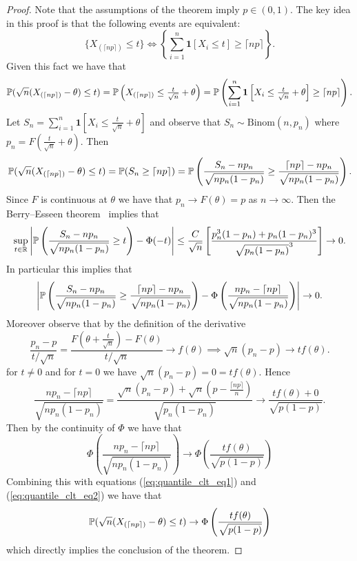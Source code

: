 \begin{proof}
	Note that the assumptions of the theorem imply $p \in (0, 1)$. The key idea in this proof is that the following events are equivalent: \[
		\{ X_{(\lceil np \rceil)} \leq t \} \iff \left\{ \sum_{i=1}^n \mathbf{1}[X_i \leq t] \geq \lceil np \rceil \right\}.
	\] Given this fact we have that \[
		\mathbb{P}(\sqrt{n} (X_{(\lceil np \rceil)} - \theta) \leq t) = \mathbb{P}\left(X_{(\lceil np \rceil)} \leq \tfrac{t}{\sqrt{n}} + \theta\right) = \mathbb{P}\left( \sum_{i=1}^n \mathbf{1}\left[X_i \leq \tfrac{t}{\sqrt{n}} + \theta\right] \geq \lceil np \rceil \right).
	\] Let $S_n = \sum_{i=1}^n \mathbf{1}\left[X_i \leq \tfrac{t}{\sqrt{n}} + \theta\right]$ and observe that $S_n \sim \text{Binom}\left(n, p_n\right)$ where $p_n = F(\tfrac{t}{\sqrt{n}} + \theta)$. Then \begin{equation}
		\mathbb{P}(\sqrt{n} (X_{(\lceil np \rceil)} - \theta) \leq t) = \mathbb{P}(S_n \geq \lceil np \rceil) = \mathbb{P}\left( \frac{S_n - np_n}{\sqrt{np_n(1-p_n)}} \geq \frac{\lceil np \rceil - np_n}{\sqrt{np_n(1-p_n)}}  \right). \label{eq:quantile_clt_eq1}
	\end{equation}
	Since $F$ is continuous at $\theta$ we have that $p_n \to F(\theta) = p$ as $n \to \infty$. Then the Berry--Esseen theorem~\cite{Berry1941,Esseen1942} implies that \[
		\sup_{t \in \mathbb{R}} \left| \mathbb{P}\left( \frac{S_n - np_n}{\sqrt{np_n(1-p_n)}} \geq t \right) - \Phi(-t) \right| \leq \frac{C}{\sqrt{n}} \left[\frac{p_n^3(1-p_n) + p_n(1-p_n)^3}{\sqrt{p_n(1-p_n)}^3} \right] \to 0.
	\] In particular this implies that \begin{equation}
	\left| \mathbb{P}\left( \frac{S_n - np_n}{\sqrt{np_n(1-p_n)}} \geq \frac{\lceil np \rceil - np_n}{\sqrt{np_n(1-p_n)}}  \right) - \Phi\left( \frac{np_n - \lceil np \rceil}{\sqrt{np_n(1-p_n)}}  \right) \right| \to 0. \label{eq:quantile_clt_eq2}
	\end{equation} Moreover observe that by the definition of the derivative\[
		\frac{p_n - p}{t / \sqrt{n}} = \frac{F\left(\theta + \tfrac{t}{\sqrt{n}}\right) - F(\theta)}{t/\sqrt{n}} \to f(\theta) \implies \sqrt{n} (p_n - p) \to tf(\theta).
	\] for $t \neq 0$ and for $t = 0$ we have $\sqrt{n} (p_n - p) = 0 = tf(\theta)$. Hence \[
		\frac{np_n - \lceil np \rceil}{\sqrt{np_n(1-p_n)}} = 
		\frac{\sqrt{n}(p_n - p) + \sqrt{n}(p - \tfrac{\lceil np \rceil}{n})}{\sqrt{p_n(1-p_n)}} \to \frac{tf(\theta) + 0}{\sqrt{p(1-p)}}.
	\] Then by the continuity of $\Phi$ we have that \[
		\Phi\left( \frac{np_n - \lceil np \rceil}{\sqrt{np_n(1-p_n)}}\right) \to \Phi\left( \frac{tf(\theta)}{\sqrt{p(1-p)}} \right)
	\] Combining this with equations (\ref{eq:quantile_clt_eq1}) and (\ref{eq:quantile_clt_eq2}) we have that \[
		\mathbb{P}(\sqrt{n} (X_{(\lceil np \rceil)} - \theta) \leq t) \to \Phi\left( \frac{tf(\theta)}{\sqrt{p(1-p)}} \right)
	\] which directly implies the conclusion of the theorem.
\end{proof}

